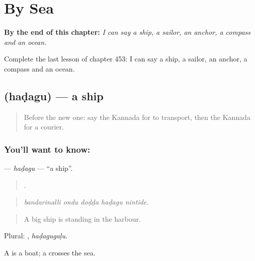
\chapter{By Sea}
\label{ch:ka-by-sea}

\begin{chapteropening}
\textbf{By the end of this chapter:} \emph{I can say a ship, a sailor, an anchor, a compass and an ocean.}

Complete the last lesson of chapter 453: I can say a ship, a sailor, an anchor, a compass and an ocean.
\end{chapteropening}

\section[\texorpdfstring{\kn{ಹಡಗು} (haḍagu)}{ಹಡಗು (haḍagu)}]{ (haḍagu) — a ship}

\label{lesson:KA-C453-hadagu}



\begin{quote}
Before the new one: say the Kannada for to transport, then the Kannada for a courier.
\end{quote}

\subsection*{You'll want to know: }
\textbf{} — \emph{haḍagu} — \textquotedblleft{}a ship\textquotedblright{}.

\begin{quote}
    .
\end{quote}

\begin{quote}
\emph{bandarinalli ondu doḍḍa haḍagu nintide.}
\end{quote}

\begin{quote}
A big ship is standing in the harbour.
\end{quote}

Plural: , \emph{haḍagugaḷu}.

A  is a boat; a  crosses the sea.

